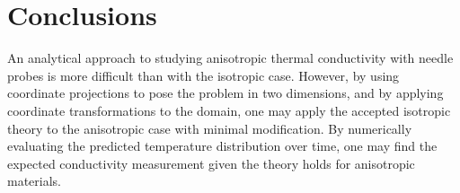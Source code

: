 \section{Conclusions}
\label{sec:analytical-np:conclusion}

An analytical approach to studying anisotropic thermal conductivity with needle
probes is more difficult than with the isotropic case. However, by using
coordinate projections to pose the problem in two dimensions, and by applying
coordinate transformations to the domain, one may apply the accepted isotropic
theory to the anisotropic case with minimal modification.  By numerically
evaluating the predicted temperature distribution over time, one may find the
expected conductivity measurement given the theory holds for anisotropic
materials.

